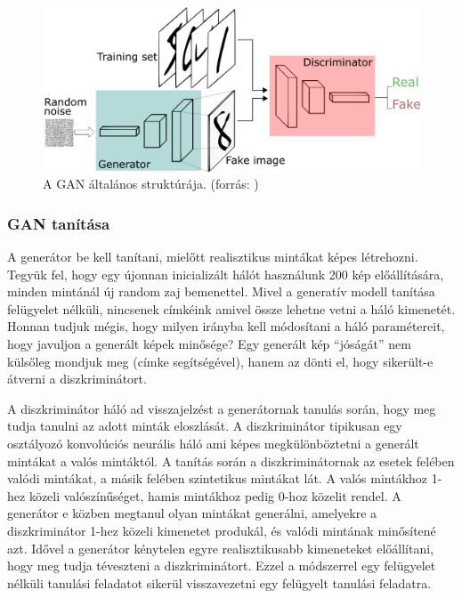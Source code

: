 
\begin{figure}[ht]
	\centering
	\includegraphics[width=0.9\columnwidth]{figures/gan_struct.png}
	\caption{A GAN általános struktúrája. (forrás: \cite{fig:gan_struct})}
	\label{fig:gan_struct}
\end{figure}

\subsubsection{GAN tanítása}

A generátor be kell tanítani, mielőtt realisztikus mintákat képes létrehozni. Tegyük fel, hogy egy újonnan inicializált hálót használunk 200 kép előállítására, minden mintánál új random zaj bemenettel. Mivel a generatív modell tanítása felügyelet nélküli, nincsenek címkéink amivel össze lehetne vetni a háló kimenetét. Honnan tudjuk mégis, hogy milyen irányba kell módosítani a háló paramétereit, hogy javuljon a generált képek minősége? Egy generált kép ``jóságát'' nem külsőleg mondjuk meg (címke segítségével), hanem az dönti el, hogy sikerült-e átverni a diszkriminátort.

A diszkriminátor háló ad visszajelzést a generátornak tanulás során, hogy meg tudja tanulni az adott minták eloszlását. A diszkriminátor tipikusan egy osztályozó konvolúciós neurális háló ami képes megkülönböztetni a generált mintákat a valós mintáktól. A tanítás során a diszkriminátornak az esetek felében valódi mintákat, a másik felében szintetikus mintákat lát. A valós mintákhoz 1-hez közeli valószínűséget, hamis mintákhoz pedig 0-hoz közelit rendel. A generátor e közben megtanul olyan mintákat generálni, amelyekre a diszkriminátor 1-hez közeli kimenetet produkál, és valódi mintának minősítené azt. Idővel a generátor kénytelen egyre realisztikusabb kimeneteket előállítani, hogy meg tudja téveszteni a diszkriminátort. Ezzel a módszerrel egy felügyelet nélküli tanulási feladatot sikerül visszavezetni egy felügyelt tanulási feladatra.

